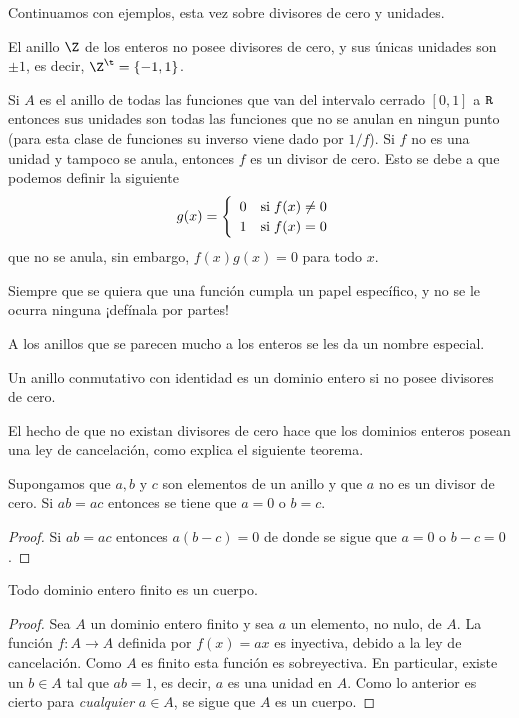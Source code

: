 Continuamos con ejemplos, esta vez sobre divisores de cero y unidades.
\begin{ejem}
	El anillo $\Z$ de los enteros no posee divisores de cero, y sus únicas unidades son $\pm 1$, es decir, $\Z^{\t} = \{-1,1\}$.
\end{ejem}
\begin{ejem} 
	Si $A$ es el anillo de todas las funciones que van del intervalo cerrado $[0,1]$ a $\texttt{R}$ entonces sus unidades son todas las funciones que no se anulan en ningun punto (para esta clase de funciones su inverso viene dado por $1/f$). Si $f$ no es una unidad y tampoco se anula, entonces $f$ es un divisor de cero. Esto se debe a que podemos definir la siguiente 
	\[ g(x) = \begin{cases}
	\hspace{.5em} 0  \quad \text{si} \; f(x) \neq 0 \\ 
	\hspace{.5em} 1 \quad \text{si} \; f(x) = 0
	\end{cases} \]
	que no se anula, sin embargo, $f(x)g(x) = 0$ para todo $x$.
\end{ejem} 
\begin{nota}
	Siempre que se quiera que una función cumpla un papel específico, y no se le ocurra ninguna ¡defínala por partes!
\end{nota}
A los anillos que se parecen mucho a los enteros se les da un nombre especial.

\begin{defi} 
	Un anillo conmutativo con identidad es un dominio entero si no posee divisores de cero.
\end{defi}
%
El hecho de que no existan divisores de cero hace que los dominios enteros posean una ley de cancelación, como explica el siguiente teorema.
\begin{teo}
	Supongamos que $a,b$ y $c$ son elementos de un anillo y que $a$ no es un divisor de cero. Si $ab=ac$ entonces se tiene que $a=0$ o $b=c$.
\end{teo}
\begin{proof}
	Si $ab = ac$ entonces $a(b-c) = 0$ de donde se sigue que $a = 0$ o $b-c = 0$. 
\end{proof} 
\begin{cor}
	Todo dominio entero finito es un cuerpo.
\end{cor} 
\begin{proof}
	Sea $A$ un dominio entero finito y sea $a$ un elemento, no nulo, de $A$. La función $f\mathpunct{:}A \to A$ definida por $f(x) = ax$ es inyectiva, debido a la ley de cancelación. Como $A$ es finito esta función es sobreyectiva. En particular, existe un $b \in A$ tal que $ab=1$, es decir, $a$ es una unidad en $A$. Como lo anterior es cierto para \textit{cualquier} $a \in A$, se sigue que $A$ es un cuerpo.
\end{proof}
%
